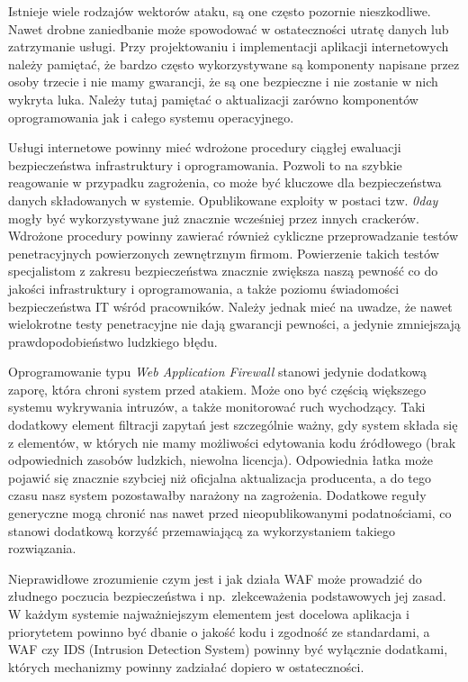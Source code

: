 \documentclass[11pt,a4paper,polish,thesis]{dcsbook}
\begin{document}
Istnieje wiele rodzajów wektorów ataku, są one często pozornie nieszkodliwe. Nawet drobne zaniedbanie może spowodować w ostateczności utratę danych lub zatrzymanie usługi. Przy projektowaniu i implementacji aplikacji internetowych należy pamiętać, że bardzo często wykorzystywane są komponenty napisane przez osoby trzecie i nie mamy gwarancji, że są one bezpieczne i nie zostanie w nich wykryta luka. Należy tutaj pamiętać o aktualizacji zarówno komponentów oprogramowania jak i całego systemu operacyjnego.

Usługi internetowe powinny mieć wdrożone procedury ciągłej ewaluacji bezpieczeństwa infrastruktury i oprogramowania. Pozwoli to na szybkie reagowanie w przypadku zagrożenia, co może być kluczowe dla bezpieczeństwa danych składowanych w systemie. Opublikowane exploity w postaci tzw. \textit{0day} mogły być wykorzystywane już znacznie wcześniej przez innych crackerów. Wdrożone procedury powinny zawierać również cykliczne przeprowadzanie testów penetracyjnych powierzonych zewnętrznym firmom. Powierzenie takich testów specjalistom z zakresu bezpieczeństwa znacznie zwiększa naszą pewność co do jakości infrastruktury i oprogramowania, a także poziomu świadomości bezpieczeństwa IT wśród pracowników. Należy jednak mieć na uwadze, że nawet wielokrotne testy penetracyjne nie dają gwarancji pewności, a jedynie zmniejszają prawdopodobieństwo ludzkiego błędu.

Oprogramowanie typu \textit{Web Application Firewall} stanowi jedynie dodatkową zaporę, która chroni system przed atakiem. Może ono być częścią większego systemu wykrywania intruzów, a także monitorować ruch wychodzący. Taki dodatkowy element filtracji zapytań jest szczególnie ważny, gdy system składa się z elementów, w których nie mamy możliwości edytowania kodu źródłowego (brak odpowiednich zasobów ludzkich, niewolna licencja). Odpowiednia łatka może pojawić się znacznie szybciej niż oficjalna aktualizacja producenta, a do tego czasu nasz system pozostawałby narażony na zagrożenia. Dodatkowe reguły generyczne mogą chronić nas nawet przed nieopublikowanymi podatnościami, co stanowi dodatkową korzyść przemawiającą za wykorzystaniem takiego rozwiązania.

Nieprawidłowe zrozumienie czym jest i jak działa WAF może prowadzić do złudnego poczucia bezpieczeństwa i np.~zlekceważenia podstawowych jej zasad. W każdym systemie najważniejszym elementem jest docelowa aplikacja i priorytetem powinno być dbanie o jakość kodu i zgodność ze standardami, a WAF czy IDS (Intrusion Detection System) powinny być wyłącznie dodatkami, których mechanizmy powinny zadziałać dopiero w ostateczności.
 
\end{document}
